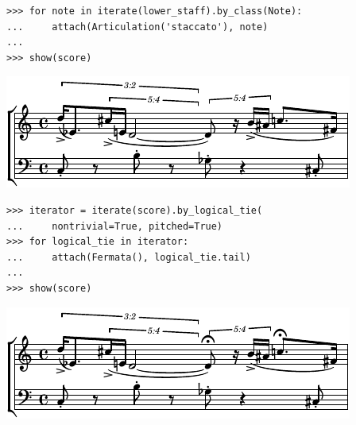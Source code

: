 \documentclass{article}
\begin{document}

\begin{lstlisting}
>>> for note in iterate(lower_staff).by_class(Note):
...     attach(Articulation('staccato'), note)
...
>>> show(score)
\end{lstlisting}
\includegraphics{assets/lilypond-fa4c8d9019fcef2563aed3d7dc4eda70.pdf}

\begin{lstlisting}
>>> iterator = iterate(score).by_logical_tie(
...     nontrivial=True, pitched=True)
>>> for logical_tie in iterator:
...     attach(Fermata(), logical_tie.tail)
...
>>> show(score)
\end{lstlisting}
\includegraphics{assets/lilypond-daae1fa8ba1e5fe23f35c69be7e07f93.pdf}

\end{document}
